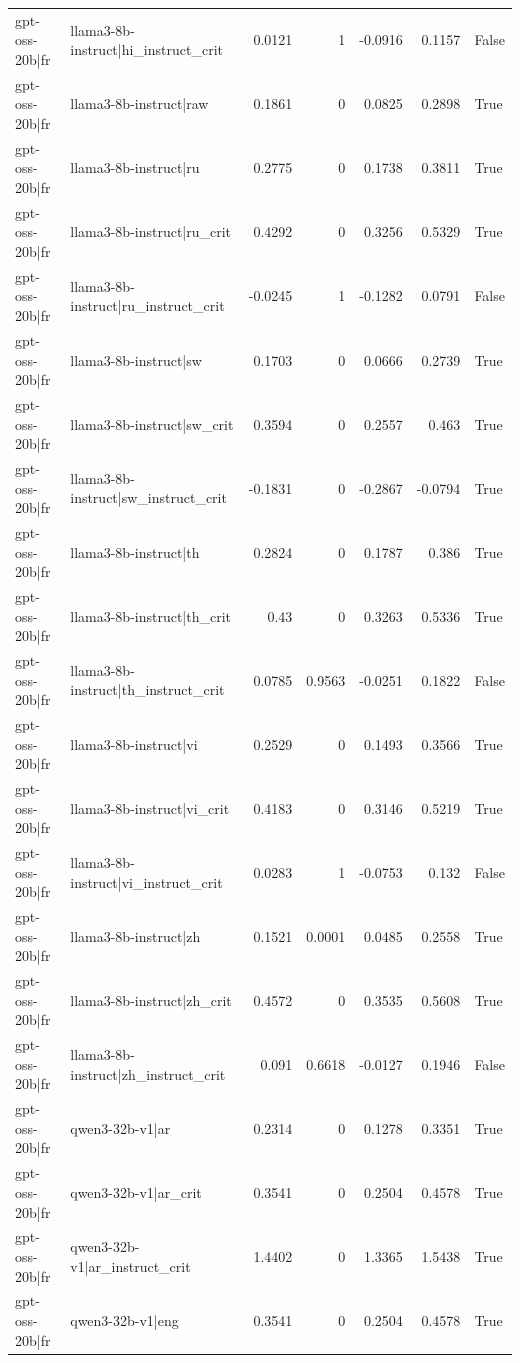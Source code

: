 \begin{table}
\begin{tabular}{l l r r r r l}
gpt-oss-20b|fr & llama3-8b-instruct|hi_instruct_crit & 0.0121 & 1 & -0.0916 & 0.1157 & False \\
gpt-oss-20b|fr & llama3-8b-instruct|raw & 0.1861 & 0 & 0.0825 & 0.2898 & True \\
gpt-oss-20b|fr & llama3-8b-instruct|ru & 0.2775 & 0 & 0.1738 & 0.3811 & True \\
gpt-oss-20b|fr & llama3-8b-instruct|ru_crit & 0.4292 & 0 & 0.3256 & 0.5329 & True \\
gpt-oss-20b|fr & llama3-8b-instruct|ru_instruct_crit & -0.0245 & 1 & -0.1282 & 0.0791 & False \\
gpt-oss-20b|fr & llama3-8b-instruct|sw & 0.1703 & 0 & 0.0666 & 0.2739 & True \\
gpt-oss-20b|fr & llama3-8b-instruct|sw_crit & 0.3594 & 0 & 0.2557 & 0.463 & True \\
gpt-oss-20b|fr & llama3-8b-instruct|sw_instruct_crit & -0.1831 & 0 & -0.2867 & -0.0794 & True \\
gpt-oss-20b|fr & llama3-8b-instruct|th & 0.2824 & 0 & 0.1787 & 0.386 & True \\
gpt-oss-20b|fr & llama3-8b-instruct|th_crit & 0.43 & 0 & 0.3263 & 0.5336 & True \\
gpt-oss-20b|fr & llama3-8b-instruct|th_instruct_crit & 0.0785 & 0.9563 & -0.0251 & 0.1822 & False \\
gpt-oss-20b|fr & llama3-8b-instruct|vi & 0.2529 & 0 & 0.1493 & 0.3566 & True \\
gpt-oss-20b|fr & llama3-8b-instruct|vi_crit & 0.4183 & 0 & 0.3146 & 0.5219 & True \\
gpt-oss-20b|fr & llama3-8b-instruct|vi_instruct_crit & 0.0283 & 1 & -0.0753 & 0.132 & False \\
gpt-oss-20b|fr & llama3-8b-instruct|zh & 0.1521 & 0.0001 & 0.0485 & 0.2558 & True \\
gpt-oss-20b|fr & llama3-8b-instruct|zh_crit & 0.4572 & 0 & 0.3535 & 0.5608 & True \\
gpt-oss-20b|fr & llama3-8b-instruct|zh_instruct_crit & 0.091 & 0.6618 & -0.0127 & 0.1946 & False \\
gpt-oss-20b|fr & qwen3-32b-v1|ar & 0.2314 & 0 & 0.1278 & 0.3351 & True \\
gpt-oss-20b|fr & qwen3-32b-v1|ar_crit & 0.3541 & 0 & 0.2504 & 0.4578 & True \\
gpt-oss-20b|fr & qwen3-32b-v1|ar_instruct_crit & 1.4402 & 0 & 1.3365 & 1.5438 & True \\
gpt-oss-20b|fr & qwen3-32b-v1|eng & 0.3541 & 0 & 0.2504 & 0.4578 & True \\

\end{tabular}
\end{table}
